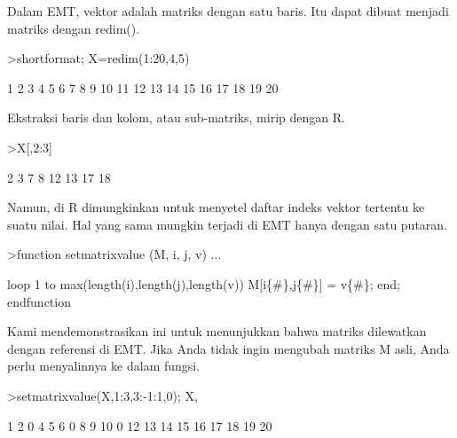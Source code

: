 \documentclass[a4paper,10pt]{article}
\begin{document}
\begin{eulernotebook}
\begin{eulercomment}
\begin{eulercomment}
\begin{eulercomment}
\begin{eulercomment}
\begin{eulercomment}
\begin{eulercomment}
\begin{eulercomment}
Dalam EMT, vektor adalah matriks dengan satu baris. Itu dapat dibuat
menjadi matriks dengan redim().
\end{eulercomment}
\begin{eulerprompt}
>shortformat; X=redim(1:20,4,5)
\end{eulerprompt}
\begin{euleroutput}
          1         2         3         4         5 
          6         7         8         9        10 
         11        12        13        14        15 
         16        17        18        19        20 
\end{euleroutput}
\begin{eulercomment}
Ekstraksi baris dan kolom, atau sub-matriks, mirip dengan R.
\end{eulercomment}
\begin{eulerprompt}
>X[,2:3]
\end{eulerprompt}
\begin{euleroutput}
          2         3 
          7         8 
         12        13 
         17        18 
\end{euleroutput}
\begin{eulercomment}
Namun, di R dimungkinkan untuk menyetel daftar indeks vektor tertentu
ke suatu nilai. Hal yang sama mungkin terjadi di EMT hanya dengan satu
putaran.
\end{eulercomment}
\begin{eulerprompt}
>function setmatrixvalue (M, i, j, v) ...
\end{eulerprompt}
\begin{eulerudf}
  loop 1 to max(length(i),length(j),length(v))
     M[i\{#\},j\{#\}] = v\{#\};
  end;
  endfunction
\end{eulerudf}
\begin{eulercomment}
Kami mendemonstrasikan ini untuk menunjukkan bahwa matriks dilewatkan
dengan referensi di EMT. Jika Anda tidak ingin mengubah matriks M
asli, Anda perlu menyalinnya ke dalam fungsi.
\end{eulercomment}
\begin{eulerprompt}
>setmatrixvalue(X,1:3,3:-1:1,0); X,
\end{eulerprompt}
\begin{euleroutput}
          1         2         0         4         5 
          6         0         8         9        10 
          0        12        13        14        15 
         16        17        18        19        20 
\end{euleroutput}
\begin{eulercomment}

\end{eulercomment}
\end{eulercomment}
\end{eulercomment}
\end{eulercomment}
\end{eulercomment}
\end{eulercomment}
\end{eulercomment}
\end{eulernotebook}
\end{document}
